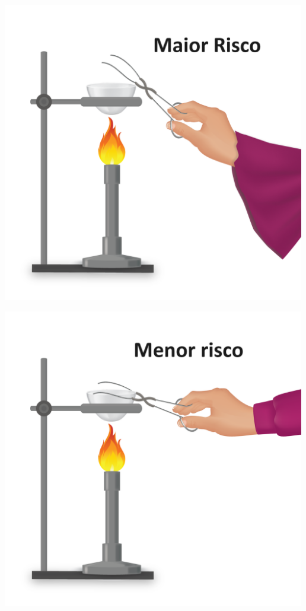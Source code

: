 \documentclass[
  letterpaper,
  DIV=11,
  numbers=noendperiod]{scrartcl}
\begin{document}
\includegraphics[width=5.20833in,height=\textheight,keepaspectratio]{imagens/image_3.27e26638.png}

\includegraphics[width=5.20833in,height=\textheight,keepaspectratio]{imagens/image_4.b26a4074.png}
\end{document}
